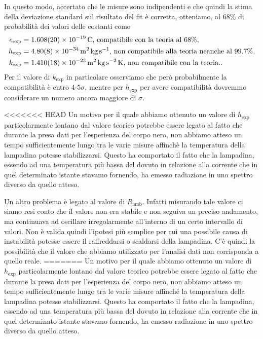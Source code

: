 \documentclass[a4paper, varvw, nofootinbib]{revtex4-2}
\begin{document}
In questo modo, accertato che le misure sono indipendenti e che quindi la stima della deviazione standard sul risultato del fit è corretta, otteniamo, al $68\%$ di probabilità dei valori delle costanti come \[
    \begin{aligned}
        e_\text{exp} &= \SI{1.608 +- 0.020 e-19}{\coulomb}\text{, compatibile con la teoria al $68\%$},\\
        h_\text{exp} &= \SI{4.80 +- 0.08 e-34}{\metre\squared\kilo\gram\per\second}\text{, non compatibile alla teoria neanche al 99.7\%},\\
        k_\text{exp} &= \SI{1.410 +- 0.018 e-23}{\metre\squared\kilo\gram\per\second\squared\kelvin}\text{, non compatibile con la teoria.}.
    \end{aligned}
\] Per il valore di $k_\text{exp}$ in particolare osserviamo che però probabilmente la compatibilità è entro $4$-$5\sigma$, mentre per $h_\text{exp}$ per avere compatibilità dovremmo considerare un numero ancora maggiore di $\sigma$. 

<<<<<<< HEAD
Un motivo per il quale abbiamo ottenuto un valore di $h_\text{exp}$ particolarmente lontano dal valore teorico potrebbe essere legato al fatto che durante la presa dati per l'esperienza del corpo nero, non abbiamo atteso un tempo sufficientemente lungo tra le varie misure affinchè la temperatura della lampadina potesse stabilizzarsi. Questo ha comportato il fatto che la lampadina, essendo ad una temperatura più bassa del dovuto in relazione alla corrente che in quel determinato istante stavamo fornendo, ha emesso radiazione in uno spettro diverso da quello atteso.

Un altro problema è legato al valore di $R_\text{amb}$. Infatti misurando tale valore ci siamo resi conto che il valore non era stabile e non seguiva un preciso andamento, ma continuava ad oscillare irregolarmente all'interno di un certo intervallo di valori. Non è valida quindi l'ipotesi più semplice per cui una possibile causa di instabilità potesse essere il raffreddarsi o scaldarsi della lampadina. C'è quindi la possibilità che il valore che abbiamo utilizzato per l'analisi dati non corrisponda a quello reale.
=======
Un motivo per il quale abbiamo ottenuto un valore di $h_\text{exp}$ particolarmente lontano dal valore teorico potrebbe essere legato al fatto che durante la presa dati per l'esperienza del corpo nero, non abbiamo atteso un tempo sufficientemente lungo tra le varie misure affinché la temperatura della lampadina potesse stabilizzarsi. Questo ha comportato il fatto che la lampadina, essendo ad una temperatura più bassa del dovuto in relazione alla corrente che in quel determinato istante stavamo fornendo, ha emesso radiazione in uno spettro diverso da quello atteso.
\end{document}
